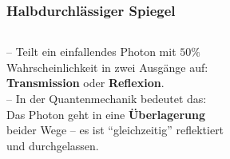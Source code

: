 \begin{frame}
\end{frame}

\begin{frame}
	\frametitle{Halbdurchl{\"a}ssiger Spiegel}
		\begin{columns}
		\begin{column}{0.64\linewidth}
			-- Teilt ein einfallendes Photon mit $50\%$\\
				\hspace{0.5em} Wahrscheinlichkeit in zwei Ausgänge auf: \\
				\hspace{0.5em} \textbf{Transmission} oder \textbf{Reflexion}.\\
			--  In der Quantenmechanik bedeutet das:\\
				\hspace{0.5em} Das Photon geht in eine \textbf{{\"U}berlagerung} \\
				\hspace{0.5em} beider Wege – es ist \enquote{gleichzeitig} reflektiert \\
				\hspace{0.5em} und durchgelassen.\\
		\end{column}
		\begin{column}{0.34\linewidth}
		\end{column}
	\end{columns}
\end{frame}

